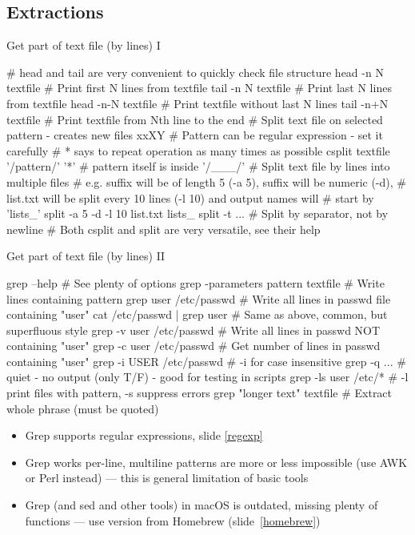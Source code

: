 \documentclass[compress, xelatex, 11pt, xcolor=svgnames, aspectratio=169,
	hyperref={
		bookmarks=true,
		unicode=true,
		colorlinks=true,
		pdftitle={Linux, command line and MetaCentrum},
		plainpages=false,
		pdfauthor={Vojtech Zeisek},
		pdfsubject={Course about use of Linux command line, writing shell scripts and using MetaCentrum of CESNET},
		pdfcreator={XeLaTeX},
		pdfkeywords={Linux, GNU, BASH, shell, command line, MetaCentrum},
		linkcolor=DarkRed, %
		anchorcolor=DarkBlue, %
		citecolor=Indigo, %
		filecolor=NavyBlue, %
		menucolor=DarkMagenta, %
		urlcolor=DarkBlue, %
		},
	url={hyphens, lowtilde} %
	]{beamer}
\begin{document}
\subsection{Extractions}

\begin{frame}[fragile]{Get part of text file (by lines) I}
	\begin{bashcode}
    # head and tail are very convenient to quickly check file structure
    head -n N textfile # Print first N lines from textfile
    tail -n N textfile # Print last N lines from textfile
    head -n-N textfile # Print textfile without last N lines
    tail -n+N textfile # Print textfile from Nth line to the end
    # Split text file on selected pattern - creates new files xxXY
    # Pattern can be regular expression - set it carefully
    # {*} says to repeat operation as many times as possible
    csplit textfile '/pattern/' '{*}' # pattern itself is inside '/___/'
    # Split text file by lines into multiple files
    # e.g. suffix will be of length 5 (-a 5), suffix will be numeric (-d),
    # list.txt will be split every 10 lines (-l 10) and output names will
    # start by 'lists_'
    split -a 5 -d -l 10 list.txt lists_
    split -t ... # Split by separator, not by newline
    # Both csplit and split are very versatile, see their help
	\end{bashcode}
\end{frame}

\begin{frame}[fragile]{Get part of text file (by lines) II}
	\begin{bashcode}
    grep --help # See plenty of options
    grep -parameters pattern textfile # Write lines containing pattern
    grep user /etc/passwd # Write all lines in passwd file containing "user"
    cat /etc/passwd | grep user # Same as above, common, but superfluous style
    grep -v user /etc/passwd # Write all lines in passwd NOT containing "user"
    grep -c user /etc/passwd # Get number of lines in passwd containing "user"
    grep -i USER /etc/passwd # -i for case insensitive
    grep -q ... # quiet - no output (only T/F) - good for testing in scripts
    grep -ls user /etc/* # -l print files with pattern, -s suppress errors
    grep "longer text" textfile # Extract whole phrase (must be quoted)
	\end{bashcode}
	\begin{itemize}
		\item Grep supports regular expressions, slide \ref{regexp}
		\item Grep works per-line, multiline patterns are more or less impossible (use AWK or Perl instead) --- this is general limitation of basic tools
		\item Grep (and sed and other tools) in macOS is outdated, missing plenty of functions --- use version from Homebrew (slide~\ref{homebrew})
	\end{itemize}
\end{frame}
\end{document}
